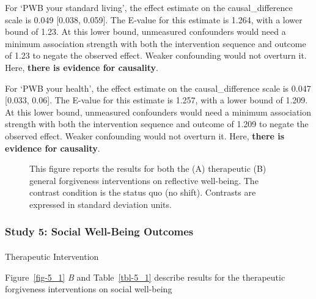\documentclass[
  single column]{article}
\makeatletter
\let\oldparagraph\paragraph
\renewcommand{\paragraph}{
    \@ifstar
      \xxxParagraphStar
      \xxxParagraphNoStar
  }
\newcommand{\xxxParagraphStar}[1]{\oldparagraph*{#1}\mbox{}}
\newcommand{\xxxParagraphNoStar}[1]{\oldparagraph{#1}\mbox{}}
\makeatother
\begin{document}
For `PWB your standard living', the effect estimate on the
causal\_difference scale is 0.049 {[}0.038, 0.059{]}. The E-value for
this estimate is 1.264, with a lower bound of 1.23. At this lower bound,
unmeasured confounders would need a minimum association strength with
both the intervention sequence and outcome of 1.23 to negate the
observed effect. Weaker confounding would not overturn it. Here,
\textbf{there is evidence for causality}.

For `PWB your health', the effect estimate on the causal\_difference
scale is 0.047 {[}0.033, 0.06{]}. The E-value for this estimate is
1.257, with a lower bound of 1.209. At this lower bound, unmeasured
confounders would need a minimum association strength with both the
intervention sequence and outcome of 1.209 to negate the observed
effect. Weaker confounding would not overturn it. Here, \textbf{there is
evidence for causality}.

\begin{figure}


\caption{\label{fig-4_1}This figure reports the results for both the (A)
therapeutic (B) general forgiveness interventions on reflective
well-being. The contrast condition is the status quo (no shift).
Contrasts are expressed in standard deviation units.}

\end{figure}%

\newpage{}

\subsubsection{Study 5: Social Well-Being
Outcomes}\label{study-5-social-well-being-outcomes}

\paragraph{Therapeutic Intervention}\label{therapeutic-intervention-4}

Figure~\ref{fig-5_1} \emph{B} and Table~\ref{tbl-5_1} describe results
for the therapeutic forgiveness interventions on social well-being
\end{document}
